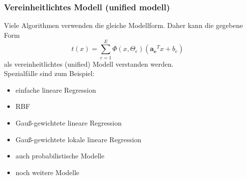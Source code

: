 	\subsubsection{Vereinheitlichtes Modell (unified modell)}
	Viele Algorithmen verwenden die gleiche Modellform. Daher kann die gegebene Form
	\begin{equation*}
		t(x) = \sum_{e=1}^E\Phi(x, \Theta_e)(\pmb{a_e}^Tx+ b_e)
	\end{equation*}
	als vereinheitlichtes (unified) Modell verstanden werden.\\[5pt]
	Spezialfälle sind zum Beispiel:
	\begin{itemize}
		\item einfache lineare Regression
		\item RBF
		\item Gauß-gewichtete lineare Regression
		\item Gauß-gewichtete lokale lineare Regression
		\item auch probabilistische Modelle
		\item noch weitere Modelle
	\end{itemize}
